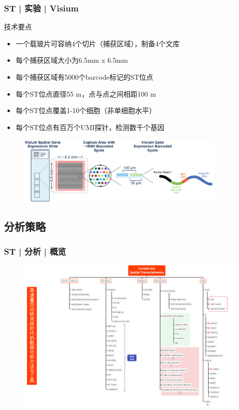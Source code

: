 \documentclass[11pt]{ctexbeamer}
\begin{document}
\begin{frame}
	\frametitle{ST | 实验 | Visium}
	\begin{block}{技术要点}
		\begin{itemize}
			\item 一个载玻片可容纳4个切片（捕获区域），制备4个文库
			\item 每个捕获区域大小为6.5mm x 6.5mm
			\item 每个捕获区域有5000个barcode标记的ST位点
			\item 每个ST位点直径55 \textmu m，点与点之间相距100 \textmu m
			\item 每个ST位点覆盖1-10个细胞\alert{（非单细胞水平）}
			\item 每个ST位点有百万个UMI探针，检测数千个基因
		\end{itemize}
		\end{block}
	\vspace{-0.5em}
		\begin{figure}
		\includegraphics[width=0.9\textwidth]{ST_design_01.png}
	\end{figure}
\end{frame}

\subsection{分析策略}
\begin{frame}
	\frametitle{ST | 分析 | 概览}
	\begin{figure}
	\includegraphics[width=\textwidth]{ST_tools.png}
   \end{figure}
\end{frame}
\end{document}

